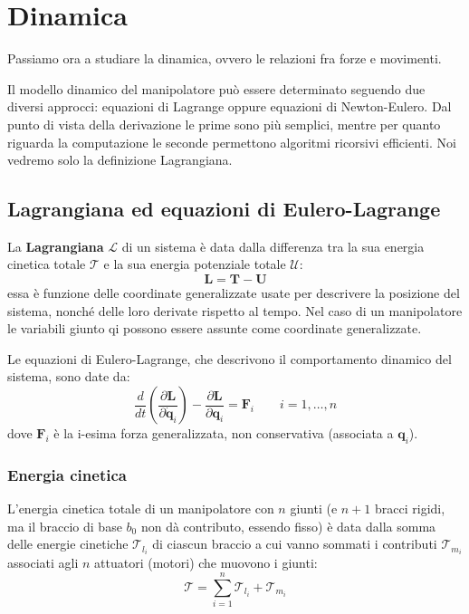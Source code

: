 \chapter{Dinamica}

Passiamo ora a studiare la dinamica, ovvero le relazioni fra forze e movimenti.

Il modello dinamico del manipolatore può essere determinato seguendo due diversi approcci: equazioni di Lagrange oppure equazioni di Newton-Eulero. Dal punto di vista della derivazione le prime sono più semplici, mentre per quanto riguarda la computazione le seconde permettono algoritmi ricorsivi efficienti. Noi vedremo solo la definizione Lagrangiana.



\section{Lagrangiana ed equazioni di Eulero-Lagrange}

La \textbf{Lagrangiana} $\mathcal{L}$ di un sistema è data dalla differenza tra la sua energia cinetica totale $\mathcal{T}$ e la sua energia potenziale totale $\mathcal{U}$:
$$
\mathcal{\bm{L = T - U}}
$$
essa è funzione delle coordinate generalizzate usate per descrivere la posizione del sistema, nonché delle loro derivate rispetto al tempo. Nel caso di un manipolatore le variabili giunto qi possono essere assunte come coordinate generalizzate. 

Le equazioni di Eulero-Lagrange, che descrivono il comportamento dinamico del sistema, sono date da:
\begin{equation}\label{eq:euler-lagrange}
\frac{d}{dt}\left(\frac{\partial \mathcal{\bm{L}}}{\partial \dot{\bm{q}}_i}\right)
-
\frac{\partial \mathcal{\bm{L}}}{\partial \bm{q}_i}
=
\mathcal{\bm{F}}_i
\qquad
i = 1, \dots, n
\end{equation}
dove $\mathcal{\bm{F}}_i$ è la i-esima forza generalizzata, non conservativa (associata a $\bm{q}_i$).



\subsection{Energia cinetica}

L’energia cinetica totale di un manipolatore con $n$ giunti (e $n + 1$ bracci rigidi, ma il braccio di base $b_0$ non dà contributo, essendo fisso) è data dalla somma delle energie cinetiche $\mathcal{T}_{l_i}$ di ciascun braccio a cui vanno sommati i contributi $\mathcal{T}_{m_i}$ associati agli $n$ attuatori (motori) che muovono i giunti:
\begin{equation}\label{eq:kin_energy_sum}
\mathcal{T} = \sum_{i=1}^n \mathcal{T}_{l_i} + \mathcal{T}_{m_i}
\end{equation}



